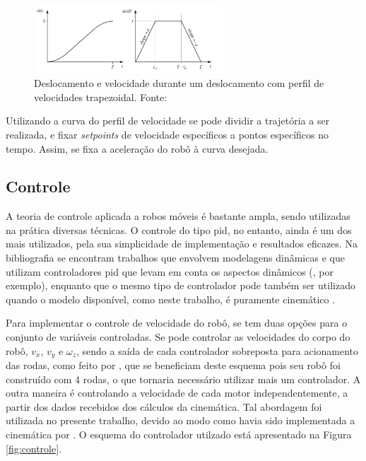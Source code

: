 \begin{figure}[h]
  \centering
  \includegraphics[width = 0.63\textwidth]{imagens/trapezoidal}
  \caption{Deslocamento e velocidade durante um deslocamento com perfil de velocidades trapezoidal. Fonte: \citet{lynch2017modern}}
  \label{fig:trap}
\end{figure}

Utilizando a curva do perfil de velocidade se pode dividir a trajetória a ser realizada, e fixar \textit{setpoints} de velocidade específicos a pontos específicos no tempo. Assim, se fixa a aceleração do robô à curva desejada.

\subsection{Controle}

A teoria de controle aplicada a robos móveis é bastante ampla, sendo utilizadas na prática diversas técnicas. O controle do tipo \acrshort{pid}, no entanto, ainda é um dos mais utilizados, pela sua simplicidade de implementação e resultados eficazes. Na bibliografia se encontram trabalhos que envolvem modelagens dinâmicas e que utilizam controladores \acrshort{pid} que levam em conta os aspectos dinâmicos (\citet{samani2007comprehensive}, por exemplo), enquanto que o mesmo tipo de controlador pode também ser utilizado quando o modelo disponível, como neste trabalho, é puramente cinemático \citep{indiveri2009swedish}.

Para implementar o controle de velocidade do robô, se tem duas opções para o conjunto de variáveis controladas. Se pode controlar as velocidades do corpo do robô, $v_x$, $v_y$ e $\omega_z$, sendo a saída de cada controlador sobreposta para acionamento das rodas, como feito por \citet{rojas2006holonomic}, que se beneficiam deste esquema pois seu robô foi construído com 4 rodas, o que tornaria necessário utilizar mais um controlador. A outra maneira é controlando a velocidade de cada motor independentemente, a partir dos dados recebidos dos cálculos da cinemática. Tal abordagem foi utilizada no presente trabalho, devido ao modo como havia sido implementada a cinemática por \cite{ritter2016modelagem}. O esquema do controlador utilzado está apresentado na Figura \ref{fig:controle}.

